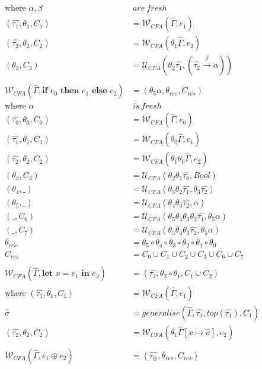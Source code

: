\documentclass[a4paper,11pt]{article}
\newcommand{\bigU}{\ensuremath{\mathcal{U}_{CFA}}\xspace}
\newcommand{\bigW}{\ensuremath{\mathcal{W}_{CFA}}\xspace}
\begin{document}
\begin{align*}
  \text{where }\alpha, \beta & ~are~fresh\\
  (\hat{\tau_1}, \theta_1, C_1) &= \bigW (\hat{\Gamma}, e_1)\\
  (\hat{\tau_2}, \theta_2, C_2) &= \bigW (\theta_1 \hat{\Gamma}, e_2)\\
  (\theta_3, C_3) &= \bigU (\theta_2 \hat{\tau_1}, (\hat{\tau_2} \xrightarrow{\beta} \alpha))\\
  \\
  \bigW (\hat{\Gamma}, \textbf{if }e_0 \textbf{ then }e_1 \textbf{ else }e_2) &= (\theta_5 \alpha, \theta_{res}, C_{res})\\
  \text{where }\alpha & ~is~fresh\\
  (\hat{\tau_0}, \theta_0, C_0) &= \bigW (\hat{\Gamma}, e_0)\\
  (\hat{\tau_1}, \theta_1, C_1) &= \bigW (\theta_0 \hat{\Gamma}, e_1)\\
  (\hat{\tau_2}, \theta_2, C_2) &= \bigW (\theta_1 \theta_0 \hat{\Gamma}, e_2)\\
  (\theta_3, C_3) &= \bigU (\theta_2 \theta_1 \hat{\tau_0}, Bool)\\
  (\theta_4, \_) &= \bigU (\theta_3 \theta_2 \hat{\tau_1}, \theta_3 \hat{\tau_2})\\
  (\theta_5, \_) &= \bigU (\theta_4 \theta_3 \hat{\tau_2}, \alpha)\\
  (\_, C_6) &= \bigU (\theta_5 \theta_4 \theta_3 \theta_2 \hat{\tau_1}, \theta_5 \alpha)\\
  (\_, C_7) &= \bigU (\theta_5 \theta_4 \theta_3 \hat{\tau_2}, \theta_5 \alpha)\\
  \theta_{res} &= \theta_5 \circ \theta_4 \circ \theta_3 \circ \theta_2 \circ \theta_1 \circ \theta_0\\
  C_{res} &= C_0 \cup C_1 \cup C_2 \cup C_3 \cup C_6 \cup C_7\\
  \\
  \bigW (\hat{\Gamma}, \textbf{let }x = e_1 \textbf{ in }e_2) &= (\hat{\tau_2}, \theta_2 \circ \theta_1, C_1 \cup C_2)\\
  \text{where }(\hat{\tau_1}, \theta_1, C_1) &= \bigW (\hat{\Gamma}, e_1)\\
  \hat{\sigma} &= generalise (\hat{\Gamma}, \hat{\tau_1}, top(\hat{\tau_1}), C_1)\\
  (\hat{\tau_2}, \theta_2, C_2) &= \bigW (\theta_1 \hat{\Gamma}[x \mapsto \hat{\sigma}], e_2)\\
  \\ 
  \bigW (\hat{\Gamma}, e_1 \oplus e_2) &= (\hat{\tau_\oplus}, \theta_{res}, C_{res}) \\

\end{align*}
\end{document}

